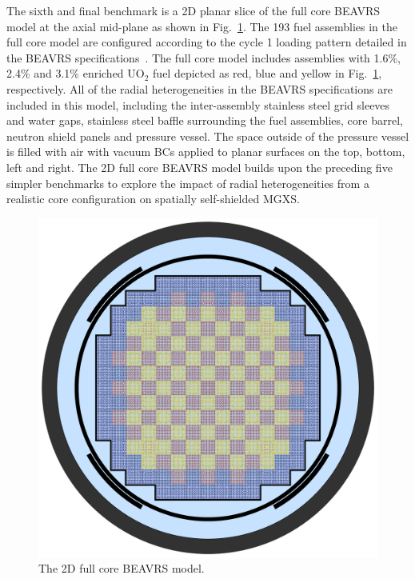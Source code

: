 The sixth and final benchmark is a 2D planar slice of the full core \ac{BEAVRS} model at the axial mid-plane as shown in Fig.~\ref{fig:chap7-full-core}. The 193 fuel assemblies in the full core model are configured according to the cycle 1 loading pattern detailed in the \ac{BEAVRS} specifications~\cite{horelik2013beavrs}. The full core model includes assemblies with 1.6\%, 2.4\% and 3.1\% enriched UO$_2$ fuel depicted as red, blue and yellow in Fig.~\ref{fig:chap7-full-core}, respectively. All of the radial heterogeneities in the \ac{BEAVRS} specifications are included in this model, including the inter-assembly stainless steel grid sleeves and water gaps, stainless steel baffle surrounding the fuel assemblies, core barrel, neutron shield panels and pressure vessel. The space outside of the pressure vessel is filled with air with vacuum \acp{BC} applied to planar surfaces on the top, bottom, left and right. The 2D full core \ac{BEAVRS} model builds upon the preceding five simpler benchmarks to explore the impact of radial heterogeneities from a realistic core configuration on spatially self-shielded \ac{MGXS}.

\begin{figure}[h!]
  \centering
  \includegraphics[width=0.9\linewidth]{figures/benchmarks/full-core}
\vspace{2mm}
\caption[The 2D full core \ac{BEAVRS} model]{The 2D full core \ac{BEAVRS} model.}
\label{fig:chap7-full-core}
\end{figure}


